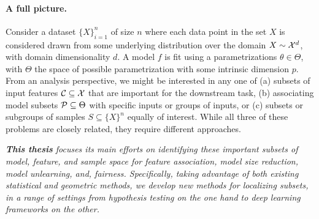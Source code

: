 \paragraph{A full picture.} Consider a dataset $\{X\}_{i=1}^n$ of size $n$ where each data point in the set $X$ is considered drawn from some underlying distribution over the domain $X \sim \mathcal{X}^d$, with domain dimensionality $d$. A model $f$ is fit using a parametrizations $\theta \in \Theta$, with $\Theta$ the space of possible parametrization with some intrinsic dimension $p$. From an analysis perspective, we might be interested in any one of (a) subsets of input features $\mathcal{C} \subseteq \mathcal{X}$ that are important for the downstream task, (b) associating model subsets $\mathcal{P} \subseteq \Theta$ with specific inputs or groups of inputs, or (c) subsets or subgroups of samples $S \subseteq \{X\}^n$ equally of interest. While all three of these problems are closely related, they require different approaches. 

\begin{mdframed}[style=MyFrame]
\em 
\textbf{This thesis} focuses its main efforts on identifying these important subsets of model, feature, and sample space for feature association, model size reduction, model unlearning, and, fairness. Specifically, taking advantage of both existing statistical and geometric methods, we develop new methods for localizing subsets, in a range of settings from hypothesis testing on the one hand to deep learning frameworks on the other.
\end{mdframed}

